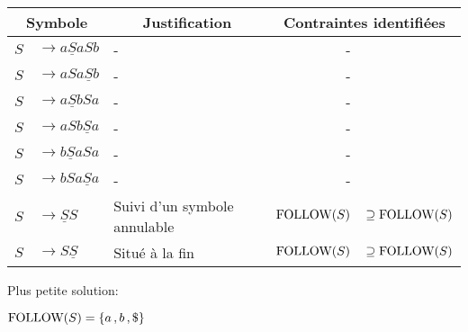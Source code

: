 \documentclass[class=article]{standalone}
\begin{document}
\begin{center}
    \begin{tabular}{|rl|l|rl|}
        \hline
        \multicolumn{2}{|c}{\bf Symbole} &
        \multicolumn{1}{|c}{\bf Justification} &
        \multicolumn{2}{|c|}{\bf Contraintes identifiées}\\
        \hline
        \hline
        $S$ & $\rightarrow a\underline{S}aSb$ & - & - & \\
        $S$ & $\rightarrow aSa\underline{S}b$ & - & - &\\
        \hline
        $S$ & $\rightarrow a\underline{S}bSa$ & - & - &\\
        $S$ & $\rightarrow aSb\underline{S}a$ & - & - &\\
        \hline
        $S$ & $\rightarrow b\underline{S}aSa$ & - & - &\\
        $S$ & $\rightarrow bSa\underline{S}a$ & - & - &\\
        \hline
        $S$ & $\rightarrow \underline{S}S$ & Suivi d'un symbole annulable & $\text{\lstinline{FOLLOW}}(S)$ & $\supseteq \text{\lstinline{FOLLOW}}(S)$\\
        $S$ & $\rightarrow S\underline{S}$ & Situé à la fin & $\text{\lstinline{FOLLOW}}(S)$ & $\supseteq \text{\lstinline{FOLLOW}}(S)$\\
        \hline
    \end{tabular}
\end{center}

Plus petite solution:

$\text{\lstinline{FOLLOW}}(S) = \acc{a \, , b \, ,\$}$
\end{document}
